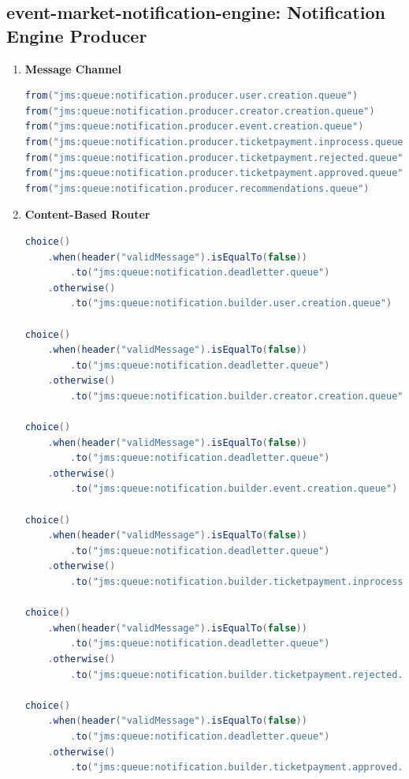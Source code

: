 \documentclass{article}
\begin{document}
\subsection{event-market-notification-engine: Notification Engine Producer}
\begin{enumerate}
    \item \textbf{Message Channel}
\begin{lstlisting}[language=Java, caption={Message Channels for Notification Engine}]
from("jms:queue:notification.producer.user.creation.queue")
from("jms:queue:notification.producer.creator.creation.queue")
from("jms:queue:notification.producer.event.creation.queue")
from("jms:queue:notification.producer.ticketpayment.inprocess.queue")
from("jms:queue:notification.producer.ticketpayment.rejected.queue")
from("jms:queue:notification.producer.ticketpayment.approved.queue")
from("jms:queue:notification.producer.recommendations.queue")
\end{lstlisting}
    \item \textbf{Content-Based Router}
\begin{lstlisting}[language=Java, caption={Content-Based Router for Notification Engine}]
choice()
    .when(header("validMessage").isEqualTo(false))
        .to("jms:queue:notification.deadletter.queue")
    .otherwise()
        .to("jms:queue:notification.builder.user.creation.queue")

choice()
    .when(header("validMessage").isEqualTo(false))
        .to("jms:queue:notification.deadletter.queue")
    .otherwise()
        .to("jms:queue:notification.builder.creator.creation.queue")

choice()
    .when(header("validMessage").isEqualTo(false))
        .to("jms:queue:notification.deadletter.queue")
    .otherwise()
        .to("jms:queue:notification.builder.event.creation.queue")

choice()
    .when(header("validMessage").isEqualTo(false))
        .to("jms:queue:notification.deadletter.queue")
    .otherwise()
        .to("jms:queue:notification.builder.ticketpayment.inprocess.queue")

choice()
    .when(header("validMessage").isEqualTo(false))
        .to("jms:queue:notification.deadletter.queue")
    .otherwise()
        .to("jms:queue:notification.builder.ticketpayment.rejected.queue")

choice()
    .when(header("validMessage").isEqualTo(false))
        .to("jms:queue:notification.deadletter.queue")
    .otherwise()
        .to("jms:queue:notification.builder.ticketpayment.approved.queue")


\end{lstlisting}
\end{enumerate}
\end{document}
